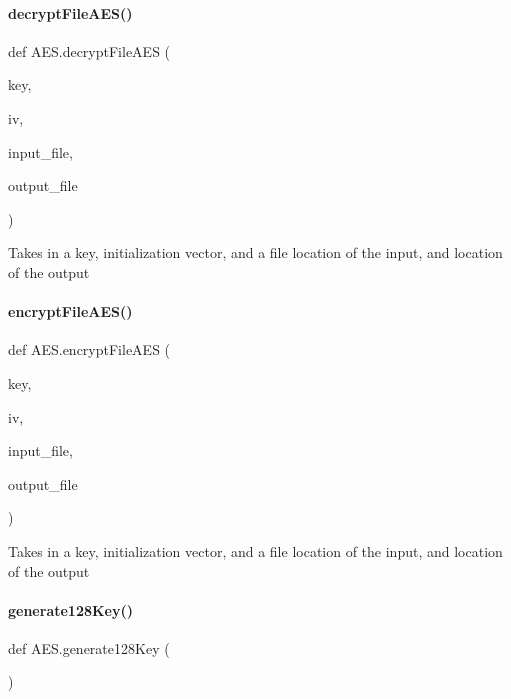 \paragraph{\texorpdfstring{decrypt\+File\+A\+E\+S()}{decryptFileAES()}}
{\footnotesize\ttfamily def A\+E\+S.\+decrypt\+File\+A\+ES (\begin{DoxyParamCaption}\item[{}]{key,  }\item[{}]{iv,  }\item[{}]{input\+\_\+file,  }\item[{}]{output\+\_\+file }\end{DoxyParamCaption})}

\begin{DoxyVerb}Takes in a key, initialization vector, and a file location of the input, and location of the output\end{DoxyVerb}
 \mbox{\label{namespace_a_e_s_a7960ab3a0ea97aa4b6f1fc0afc20dca1}} 
\paragraph{\texorpdfstring{encrypt\+File\+A\+E\+S()}{encryptFileAES()}}
{\footnotesize\ttfamily def A\+E\+S.\+encrypt\+File\+A\+ES (\begin{DoxyParamCaption}\item[{}]{key,  }\item[{}]{iv,  }\item[{}]{input\+\_\+file,  }\item[{}]{output\+\_\+file }\end{DoxyParamCaption})}

\begin{DoxyVerb}Takes in a key, initialization vector, and a file location of the input, and location of the output\end{DoxyVerb}
 \mbox{\label{namespace_a_e_s_a2f6be75a38509168dbd3b6b24bc919f7}} 
\paragraph{\texorpdfstring{generate128\+Key()}{generate128Key()}}
{\footnotesize\ttfamily def A\+E\+S.\+generate128\+Key (\begin{DoxyParamCaption}{ }\end{DoxyParamCaption})}

